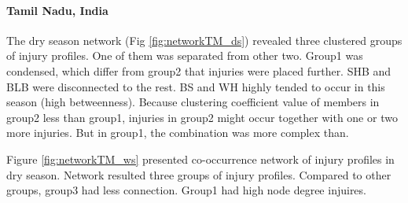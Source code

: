 \paragraph{Tamil Nadu, India}

The dry season network (Fig \ref{fig:networkTM_ds}) revealed three clustered groups of injury profiles. One of them was separated from other two. Group1 was condensed, which differ from group2 that injuries were placed further. SHB and BLB were disconnected to the rest.  BS and WH highly tended to occur in this season (high betweenness).  Because clustering coefficient value of members in group2 less than group1, injuries in group2 might occur together with one or two more injuries. But in group1, the combination was more complex than.

Figure \ref{fig:networkTM_ws} presented co-occurrence network of injury profiles in dry season. Network resulted three groups of injury profiles. Compared to other groups, group3 had less connection. Group1 had high node degree injuires.


